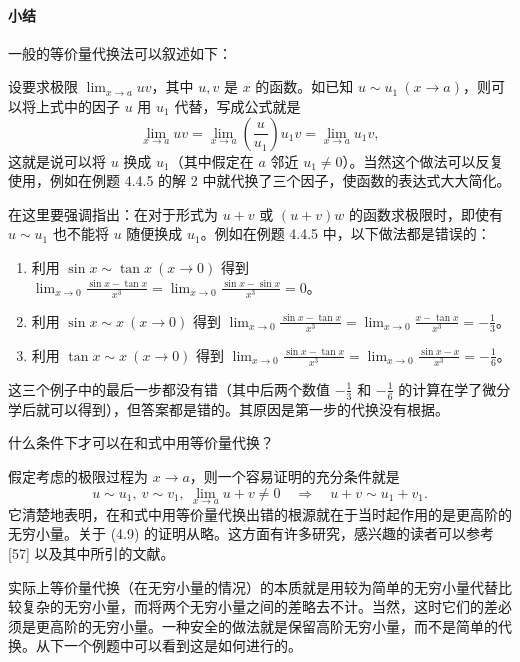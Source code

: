 \paragraph{小结}
一般的等价量代换法可以叙述如下：

设要求极限 $\lim_{x\to a}uv$，其中 $u,v$ 是 $x$ 的函数。如已知 $u\sim u_1\ (x\to a)$，则可以将上式中的因子 $u$ 用 $u_1$ 代替，写成公式就是
\begin{equation}
  \lim_{x\to a}uv
  =\lim_{x\to a}\left(\frac u{u_1}\right)u_1v
  =\lim_{x\to a}u_1v,
  \tag{4.8}
  \label{eq:4.8}
\end{equation}
这就是说可以将 $u$ 换成 $u_1$（其中假定在 $a$ 邻近 $u_1\ne0$）。当然这个做法可以反复使用，例如在例题 4.4.5 的解 2 中就代换了三个因子，使函数的表达式大大简化。

在这里要强调指出：在对于形式为 $u+v$ 或 $(u+v)w$ 的函数求极限时，即使有 $u\sim u_1$ 也不能将 $u$ 随便换成 $u_1$。例如在例题 4.4.5 中，以下做法都是错误的：
\begin{enumerate}
  \item 利用 $\sin x\sim\tan x\ (x\to0)$ 得到 $\displaystyle\lim_{x\to0}\frac{\sin x-\tan x}{x^3}=\lim_{x\to0}\frac{\sin x-\sin x}{x^3}=0$。
  \item 利用 $\sin x\sim x\ (x\to0)$ 得到 $\displaystyle\lim_{x\to0}\frac{\sin x-\tan x}{x^3}=\lim_{x\to0}\frac{x-\tan x}{x^3}=-\frac13$。
  \item 利用 $\tan x\sim x\ (x\to0)$ 得到 $\displaystyle\lim_{x\to0}\frac{\sin x-\tan x}{x^3}=\lim_{x\to0}\frac{\sin x-x}{x^3}=-\frac16$。
\end{enumerate}
这三个例子中的最后一步都没有错（其中后两个数值 $-\frac13$ 和 $-\frac16$ 的计算在学了微分学后就可以得到），但答案都是错的。其原因是第一步的代换没有根据。

什么条件下才可以在和式中用等价量代换？

假定考虑的极限过程为 $x\to a$，则一个容易证明的充分条件就是
\begin{equation}
  u\sim u_1,\ v\sim v_1,\ \lim_{x\to a}u+v\ne0
  \quad\Longrightarrow\quad u+v\sim u_1+v_1.
  \tag{4.9}
  \label{eq:4.9}
\end{equation}
它清楚地表明，在和式中用等价量代换出错的根源就在于当时起作用的是更高阶的无穷小量。关于 (4.9) 的证明从略。这方面有许多研究，感兴趣的读者可以参考 [57] 以及其中所引的文献。

实际上等价量代换（在无穷小量的情况）的本质就是用较为简单的无穷小量代替比较复杂的无穷小量，而将两个无穷小量之间的差略去不计。当然，这时它们的差必须是更高阶的无穷小量。一种安全的做法就是保留高阶无穷小量，而不是简单的代换。从下一个例题中可以看到这是如何进行的。

